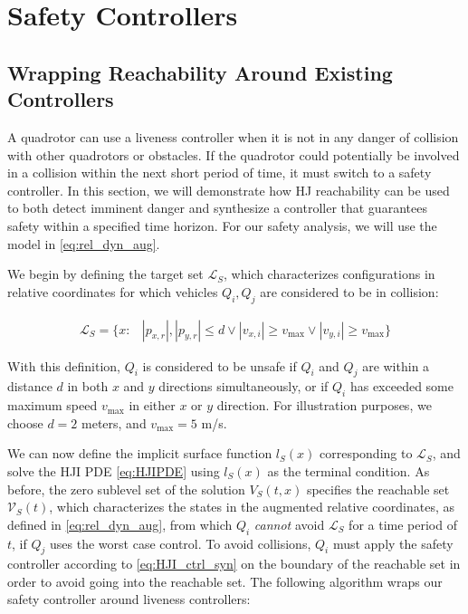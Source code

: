 \section{Safety Controllers \label{sec:safety}}
\subsection{Wrapping Reachability Around Existing Controllers}
A quadrotor can use a liveness controller when it is not in any danger of collision with other quadrotors or obstacles. If the quadrotor could potentially be involved in a collision within the next short period of time, it must switch to a safety controller. In this section, we will demonstrate how HJ reachability can be used to both detect imminent danger and synthesize a controller that guarantees safety within a specified time horizon. For our safety analysis, we will use the model in \eqref{eq:rel_dyn_aug}.

We begin by defining the target set $\mathcal{L}_S$, which characterizes configurations in relative coordinates for which vehicles $Q_i,Q_j$ are considered to be in collision:

\begin{equation}
\begin{aligned}
\mathcal{L}_S = \{x: &|p_{x,r}|, |p_{y,r}|\le d \vee |v_{x,i}| \ge v_\text{max} \vee |v_{y,i}| \ge v_\text{max} \}
\end{aligned}
\end{equation}

With this definition, $Q_i$ is considered to be unsafe if $Q_i$ and $Q_j$ are within a distance $d$ in both $x$ and $y$ directions simultaneously, or if $Q_i$ has exceeded some maximum speed $v_\text{max}$ in either $x$ or $y$ direction. For illustration purposes, we choose $d=2$ meters, and $v_\text{max}= 5$ m/s.

We can now define the implicit surface function $l_S(x)$ corresponding to $\mathcal{L}_S$, and solve the HJI PDE \eqref{eq:HJIPDE} using $l_S(x)$ as the terminal condition. As before, the zero sublevel set of the solution $V_S(t,x)$ specifies the reachable set $\mathcal{V}_S(t)$, which characterizes the states in the augmented relative coordinates, as defined in \eqref{eq:rel_dyn_aug}, from which $Q_i$ \textit{cannot} avoid $\mathcal{L}_S$ for a time period of $t$, if $Q_j$ uses the worst case control. To avoid collisions, $Q_i$ must apply the safety controller according to \eqref{eq:HJI_ctrl_syn} on the boundary of the reachable set in order to avoid going into the reachable set. The following algorithm wraps our safety controller around liveness controllers:

